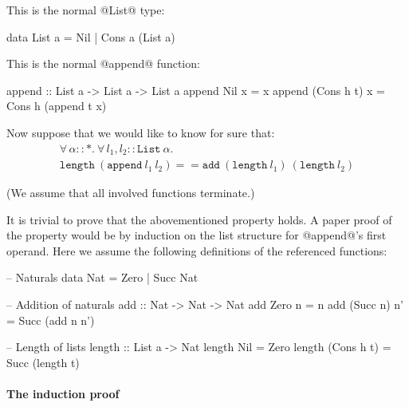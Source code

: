 \documentclass{article}
\begin{document}
\medskip

\noindent
This is the normal @List@ type:

\begin{code}
 data List a = Nil | Cons a (List a)
\end{code}

\noindent
This is the normal @append@ function:

\begin{code}
 append :: List a -> List a -> List a
 append Nil x = x
 append (Cons h t) x = Cons h (append t x)
\end{code}

\noindent
Now suppose that we would like to know for sure that:
\[\begin{array}{l}
\forall\,\alpha :: *.\ \forall\,l_1, l_2 :: \texttt{List}\ \alpha.\\ 
\texttt{length}\ (\texttt{append}\ l_1\ l_2) == 
\texttt{add}\ (\texttt{length}\ l_1)\ (\texttt{length}\ l_2)
\end{array}\]

\noindent
(We assume that all involved functions terminate.)

\medskip

\noindent
It is trivial to prove that the abovementioned property holds. A paper
proof of the property would be by induction on the list structure for
@append@'s first operand. Here we assume the following definitions of
the referenced functions:

\begin{code}
 -- Naturals
 data Nat = Zero | Succ Nat
\end{code}

\begin{code}
 -- Addition of naturals
 add :: Nat -> Nat -> Nat
 add Zero n = n
 add (Succ n) n' = Succ (add n n')
\end{code}

\begin{code}
 -- Length of lists
 length :: List a -> Nat
 length Nil = Zero
 length (Cons h t) = Succ (length t)
\end{code}


\paragraph*{The induction proof}
\end{document}
